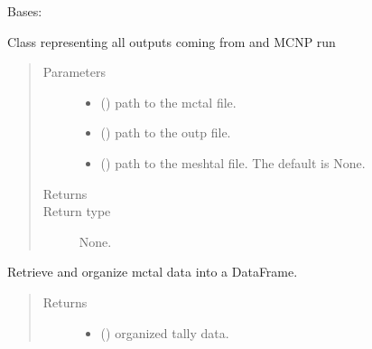 \documentclass[letterpaper,10pt,english]{sphinxmanual}
\begin{document}
\begin{fulllineitems}
\label{\detokenize{api/postprocessing:output.MCNPoutput}}
\sphinxAtStartPar
Bases: 

\sphinxAtStartPar
Class representing all outputs coming from and MCNP run
\begin{quote}\begin{description}
\item[{Parameters}] \leavevmode\begin{itemize}
\item {} 
\sphinxAtStartPar
{} () \textendash{} path to the mctal file.

\item {} 
\sphinxAtStartPar
{} () \textendash{} path to the outp file.

\item {} 
\sphinxAtStartPar
{} (\sphinxstyleliteralemphasis{\sphinxupquote{, }}) \textendash{} path to the meshtal file. The default is None.

\end{itemize}

\item[{Returns}] \leavevmode
\sphinxAtStartPar


\item[{Return type}] \leavevmode
\sphinxAtStartPar
None.

\end{description}\end{quote}

\begin{fulllineitems}
\label{\detokenize{api/postprocessing:output.MCNPoutput.organize_mctal}}
\sphinxAtStartPar
Retrieve and organize mctal data into a DataFrame.
\begin{quote}\begin{description}
\item[{Returns}] \leavevmode
\sphinxAtStartPar
\begin{itemize}
\item {} 
\sphinxAtStartPar
{} () \textendash{} organized tally data.


\end{itemize}
\end{description}
\end{quote}
\end{fulllineitems}
\end{fulllineitems}
\end{document}

